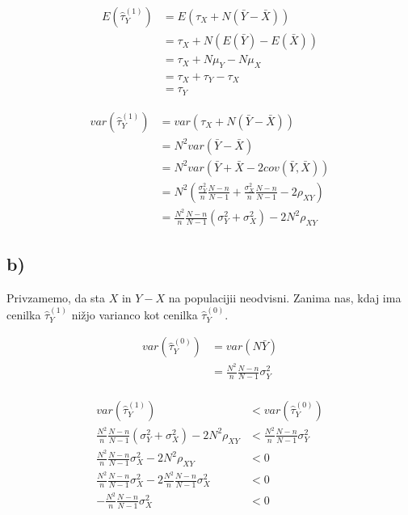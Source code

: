 \documentclass[A4paper, 11pt]{article}
\begin{document}
\[ 
\begin{split}
E(\hat{\tau}_Y ^ {(1)}) & = E(\tau_X + N (\bar{Y} - \bar{X})) \\
			       & = \tau_X  + N (E(\bar{Y}) - E(\bar{X})) \\
			       & = \tau_X + N \mu_Y - N \mu_X \\
			       & = \tau_X + \tau_Y - \tau_X \\
			       & = \tau_Y
\end{split}
\]

\[
\begin{split}
var(\hat{\tau}_Y ^ {(1)})  & = var(\tau_X + N (\bar{Y} - \bar{X})) \\
				& = N^2 var( \bar{Y} - \bar{X} ) \\
				& = N^2 var( \bar{Y} + \bar{X} - 2 cov(\bar{Y},\bar{X}) ) \\
				& = N^2 ( \frac{\sigma_Y^2}{n} \frac{N - n}{N - 1} + \frac{\sigma_X^2}{n} \frac{N - n}{N - 1} - 2\rho_{XY} ) \\
				&= \frac{N^2}{n} \frac{N - n}{N - 1} (\sigma_Y^2 + \sigma_X^2) - 2 N^2 \rho_{XY}
\end{split}
\]


\subsection*{b)}
Privzamemo, da sta $X$ in $Y - X$ na populacijii neodvisni. Zanima nas, kdaj ima cenilka $\hat{\tau}_Y ^ {(1)}$ nižjo varianco kot cenilka $\hat{\tau}_Y ^ {(0)}$.

\[
\begin{split}
var(\hat{\tau}_Y ^ {(0)}) & = var(N \bar{Y}) \\
                                          & = \frac{N^2}{n} \frac{N - n}{N - 1} \sigma_Y^2
\end{split}
\]
\\
\[
\begin{split}
var(\hat{\tau}_Y ^ {(1)}) & < var(\hat{\tau}_Y ^ {(0)}) \\
 \frac{N^2}{n} \frac{N - n}{N - 1} (\sigma_Y^2 + \sigma_X^2) - 2 N^2 \rho_{XY} & < \frac{N^2}{n} \frac{N - n}{N - 1} \sigma_Y^2 \\
 \frac{N^2}{n} \frac{N - n}{N - 1} \sigma_X^2 - 2 N^2 \rho_{XY} & < 0 \\
 \frac{N^2}{n} \frac{N - n}{N - 1} \sigma_X^2 - 2 \frac{N^2}{n} \frac{N - n}{N - 1} \sigma_X^2 & < 0 \\
 - \frac{N^2}{n} \frac{N - n}{N - 1} \sigma_X^2  & < 0 \\
\end{split}
\]
\end{document}
